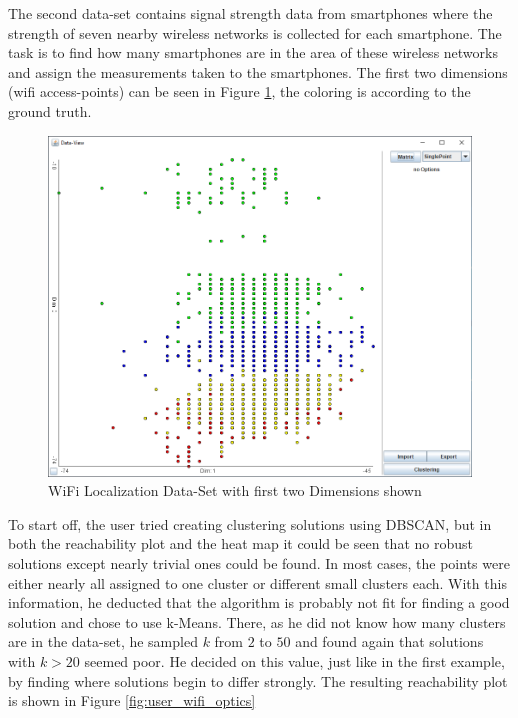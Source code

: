 \documentclass[
	a4paper,
	english,
	twoside,
	openright,               
	11pt                            
	]{report}
\begin{document}
The second data-set \cite{wireless} contains signal strength data from smartphones where the strength of seven nearby wireless networks is collected for each smartphone. The task is to find how many smartphones are in the area of these wireless networks and assign the measurements taken to the smartphones. The first two dimensions (wifi access-points) can be seen in Figure \ref{fig:user_wifi_gt}, the coloring is according to the ground truth.

\begin{figure}[h]
	\centering
	\includegraphics[scale=.4]{user_wifi_gt}
	\caption{WiFi Localization Data-Set with first two Dimensions shown}
	\label{fig:user_wifi_gt}
\end{figure}

To start off, the user tried creating clustering solutions using DBSCAN, but in both the reachability plot and the heat map it could be seen that no robust solutions except nearly trivial ones could be found. In most cases, the points were either nearly all assigned to one cluster or different small clusters each. With this information, he deducted that the algorithm is probably not fit for finding a good solution and chose to use k-Means. There, as he did not know how many clusters are in the data-set, he sampled $k$ from $2$ to $50$ and found again that solutions with $k>20$ seemed poor. He decided on this value, just like in the first example, by finding where solutions begin to differ strongly. The resulting reachability plot is shown in Figure \ref{fig:user_wifi_optics}
\end{document}
